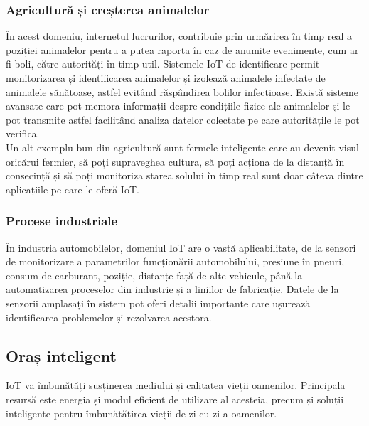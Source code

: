 \documentclass[12pt,a4paper]{report}
\begin{document}
\subsubsection{Agricultură și creșterea animalelor}
În acest domeniu, internetul lucrurilor, contribuie prin urmărirea în timp real a poziției animalelor pentru a putea raporta în caz de anumite evenimente, cum ar fi boli, către autorități în timp util. Sistemele IoT de identificare permit monitorizarea și identificarea animalelor și izolează animalele infectate de animalele sănătoase, astfel evitând răspândirea bolilor infecțioase. Există sisteme avansate care pot memora informații despre condițiile fizice ale animalelor și le pot transmite astfel facilitând analiza datelor colectate pe care autoritățile le pot verifica.\\
Un alt exemplu bun din agricultură sunt fermele inteligente care au devenit visul oricărui fermier, să poți supraveghea cultura, să poți acționa de la distanță în consecință și să poți monitoriza starea solului în timp real sunt doar câteva dintre aplicațiile pe care le oferă IoT.

\subsubsection{Procese industriale}
În industria automobilelor, domeniul IoT are o vastă aplicabilitate, de la senzori de monitorizare a parametrilor funcționării automobilului, presiune în pneuri, consum de carburant, poziție, distanțe față de alte vehicule, până la automatizarea proceselor din industrie și a liniilor de fabricație. Datele de la senzorii amplasați în sistem pot oferi detalii importante care ușurează identificarea problemelor și rezolvarea acestora. 

\subsection{Oraș inteligent}
IoT va îmbunătăți susținerea mediului și calitatea vieții oamenilor. Principala resursă este energia și modul eficient de utilizare al acesteia, precum și soluții inteligente pentru îmbunătățirea vieții de zi cu zi a oamenilor.
\end{document}
